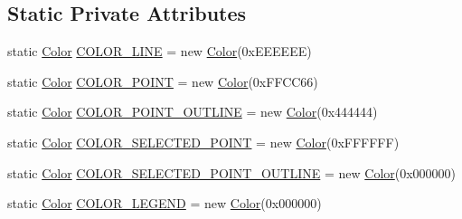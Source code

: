\subsection*{Static Private Attributes}
\begin{DoxyCompactItemize}
\item 
static \mbox{\hyperlink{classorg_1_1newdawn_1_1slick_1_1_color}{Color}} \mbox{\hyperlink{classorg_1_1newdawn_1_1slick_1_1tools_1_1peditor_1_1_graph_editor_window_ab0715de46a8c1a664ea8616442a87e63}{C\+O\+L\+O\+R\+\_\+\+L\+I\+NE}} = new \mbox{\hyperlink{classorg_1_1newdawn_1_1slick_1_1_color}{Color}}(0x\+E\+E\+E\+E\+E\+E)
\item 
static \mbox{\hyperlink{classorg_1_1newdawn_1_1slick_1_1_color}{Color}} \mbox{\hyperlink{classorg_1_1newdawn_1_1slick_1_1tools_1_1peditor_1_1_graph_editor_window_a925bd849bf6c7b7936451a83bc44559f}{C\+O\+L\+O\+R\+\_\+\+P\+O\+I\+NT}} = new \mbox{\hyperlink{classorg_1_1newdawn_1_1slick_1_1_color}{Color}}(0x\+F\+F\+C\+C66)
\item 
static \mbox{\hyperlink{classorg_1_1newdawn_1_1slick_1_1_color}{Color}} \mbox{\hyperlink{classorg_1_1newdawn_1_1slick_1_1tools_1_1peditor_1_1_graph_editor_window_ac600d4f0232046ec4333cf59070ea462}{C\+O\+L\+O\+R\+\_\+\+P\+O\+I\+N\+T\+\_\+\+O\+U\+T\+L\+I\+NE}} = new \mbox{\hyperlink{classorg_1_1newdawn_1_1slick_1_1_color}{Color}}(0x444444)
\item 
static \mbox{\hyperlink{classorg_1_1newdawn_1_1slick_1_1_color}{Color}} \mbox{\hyperlink{classorg_1_1newdawn_1_1slick_1_1tools_1_1peditor_1_1_graph_editor_window_ac59b1a1be50c68136fb646b114d33c2c}{C\+O\+L\+O\+R\+\_\+\+S\+E\+L\+E\+C\+T\+E\+D\+\_\+\+P\+O\+I\+NT}} = new \mbox{\hyperlink{classorg_1_1newdawn_1_1slick_1_1_color}{Color}}(0x\+F\+F\+F\+F\+F\+F)
\item 
static \mbox{\hyperlink{classorg_1_1newdawn_1_1slick_1_1_color}{Color}} \mbox{\hyperlink{classorg_1_1newdawn_1_1slick_1_1tools_1_1peditor_1_1_graph_editor_window_afed148816a274f4fc5301dc415cd23e2}{C\+O\+L\+O\+R\+\_\+\+S\+E\+L\+E\+C\+T\+E\+D\+\_\+\+P\+O\+I\+N\+T\+\_\+\+O\+U\+T\+L\+I\+NE}} = new \mbox{\hyperlink{classorg_1_1newdawn_1_1slick_1_1_color}{Color}}(0x000000)
\item 
static \mbox{\hyperlink{classorg_1_1newdawn_1_1slick_1_1_color}{Color}} \mbox{\hyperlink{classorg_1_1newdawn_1_1slick_1_1tools_1_1peditor_1_1_graph_editor_window_a195be9ce1e18e1d916825e729e83ed78}{C\+O\+L\+O\+R\+\_\+\+L\+E\+G\+E\+ND}} = new \mbox{\hyperlink{classorg_1_1newdawn_1_1slick_1_1_color}{Color}}(0x000000)
\item 

\end{DoxyCompactItemize}
